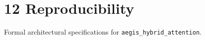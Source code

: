 \section{12 Reproducibility}

Formal architectural specifications for \texttt{aegis_hybrid_attention}.
